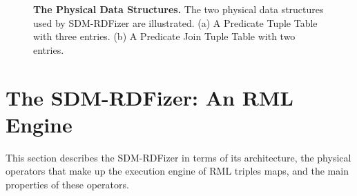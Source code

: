 \begin{figure}[h!]
 \centering

    \caption{{\bf The Physical Data Structures.} The two physical data structures used by SDM-RDFizer are illustrated. (a) A Predicate Tuple Table with three entries. (b) A Predicate Join Tuple Table with two entries.}
    \label{fig:hash_table}
\end{figure}
\section{The SDM-RDFizer: An RML Engine}
\label{sec:approach}
This section describes the SDM-RDFizer in terms of its architecture, the physical operators that make up the execution engine of RML triples maps, and the main properties of these operators.  
